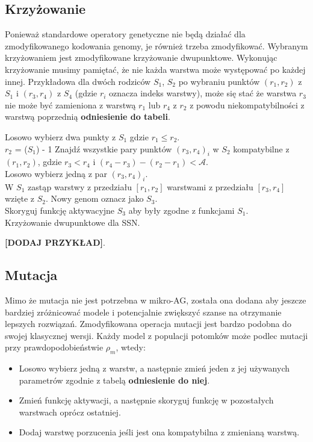 \documentclass{article}
\begin{document}
\subsection{Krzyżowanie}
Ponieważ standardowe operatory genetyczne nie będą działać dla zmodyfikowanego kodowania
genomy, je również trzeba zmodyfikować. Wybranym krzyżowaniem jest zmodyfikowane krzyżowanie
dwupunktowe. Wykonując krzyżowanie musimy pamiętać, że nie każda warstwa może występować po 
każdej innej. Przykładowa dla dwóch rodziców $S_1$, $S_2$ po wybraniu punktów $(r_1, r_2)$ z 
$S_1$ i $(r_3, r_4)$ z $S_4$ (gdzie $r_i$ oznacza indeks warstwy), może się stać że warstwa
$r_3$ nie może być zamieniona z warstwą $r_1$ lub $r_4$ z $r_2$ z powodu niekompatybilności
z warstwą poprzednią \textbf{odniesienie do tabeli}.\\
\begin{algorithm}[H]
	Losowo wybierz dwa punkty z $S_1$ gdzie $r_1 \leq r_2$.\\
	 {
		$r_2$ = ($S_1$) - 1
	}
	Znajdź wszystkie pary punktów $(r_3, r_4)_i$ w $S_2$ kompatybilne z $(r_1, r_2)$,
	gdzie $r_3 < r_4$ i $(r_4 - r_3) - (r_2 - r_1) < \mathcal{A}$.\\
	Losowo wybierz jedną z par $(r_3, r_4)_i$.\\
	W $S_1$ zastąp warstwy z przedziału $[r_1, r_2]$ warstwami z przedziału $[r_3, r_4]$
	wzięte z $S_2$. Nowy genom oznacz jako $S_3$.\\
	Skoryguj funkcję aktywacyjne $S_3$ aby były zgodne z funkcjami $S_1$.\\
	\caption{Krzyżowanie dwupunktowe dla SSN.}
\end{algorithm}
\textbf{[DODAJ PRZYKŁAD]}.

\subsection{Mutacja}
Mimo że mutacja nie jest potrzebna w mikro-AG, została ona dodana aby jeszcze bardziej
zróżnicować modele i potencjalnie zwiększyć szanse na otrzymanie lepszych rozwiązań.
Zmodyfikowana operacja mutacji jest bardzo podobna do swojej klasycznej wersji.
Każdy model z populacji potomków może podlec mutacji przy prawdopodobieństwie $\rho_m$, wtedy:
\begin{itemize}
	\item Losowo wybierz jedną z warstw, a następnie zmień jeden z jej używanych parametrów
		zgodnie z tabelą \textbf{odniesienie do niej}.
	\item Zmień funkcję aktywacji, a następnie skoryguj funkcję w pozostałych warstwach 
	oprócz ostatniej.
	\item Dodaj warstwę porzucenia jeśli jest ona kompatybilna z zmienianą warstwą.
\end{itemize}
\end{document}
